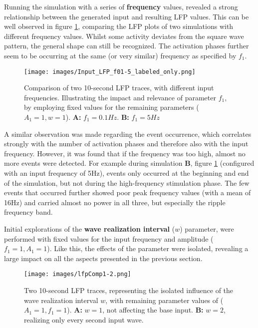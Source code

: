         Running the simulation with a series of \textbf{frequency} values, revealed a strong relationship between the generated input and resulting LFP values. This can be well observed in figure \ref{fig:input-LFP-comp-0.1_5}, comparing the LFP plots of two simulations with different frequency values. Whilst some activity deviates from the square wave pattern, the general shape can still be recognized. The activation phases further seem to be occurring at the same (or very similar) frequency as specified by \(f_1\).\\
        \begin{figure}[htbp]
            \centering
            \texttt{[image: images/Input\_LFP\_f01-5\_labeled\_only.png]}
            \caption{Comparison of two 10-second LFP traces, with different input frequencies. Illustrating the impact and relevance of parameter \(f_1\), by employing fixed values for the remaining parameters (\(A_1 = 1, w = 1\)). \textbf{A:} \(f_1 = 0.1Hz\). \textbf{B:} \(f_1 = 5Hz\)}
            \label{fig:input-LFP-comp-0.1_5}
        \end{figure}
        A similar observation was made regarding the event occurrence, which correlates strongly with the number of activation phases and therefore also with the input frequency. However, it was found that if the frequency was too high, almost no more events were detected. For example during simulation \textbf{B}, figure \ref{fig:input-LFP-comp-0.1_5} (configured with an input frequency of 5Hz), events only occurred at the beginning and end of the simulation, but not during the high-frequency stimulation phase. The few events that occurred further showed poor peak frequency values (with a mean of 16Hz) and carried almost no power in all three, but especially the ripple frequency band.
        
        Initial explorations of the \textbf{wave realization interval} (\(w\)) parameter, were performed with fixed values for the input frequency and amplitude (\(f_1 = 1, A_1 = 1\)). Like this, the effects of the parameter were isolated, revealing a large impact on all the aspects presented in the previous section.\\
        \begin{figure}[htbp]
            \centering
            \texttt{[image: images/lfpComp1-2.png]}
            \caption{Two 10-second LFP traces, representing the isolated influence of the wave realization interval \(w\), with remaining parameter values of (\(A_1 = 1, f_1 = 1\)). \textbf{A:} \(w = 1\), not affecting the base input. \textbf{B:} \(w = 2\), realizing only every second input wave.}
            \label{fig:lfp_wave_int}
        \end{figure}
        
